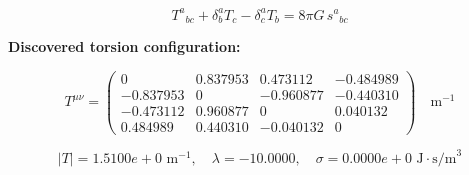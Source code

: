 
\begin{equation}
  T^a{}_{bc} + \delta^a_b T_c - \delta^a_c T_b = 8\pi G \, s^a{}_{bc}
\end{equation}

\textbf{Discovered torsion configuration:}

\begin{equation}
  T^{\mu\nu} = \begin{pmatrix}
    0 & 0.837953 & 0.473112 & -0.484989 \\
    -0.837953 & 0 & -0.960877 & -0.440310 \\
    -0.473112 & 0.960877 & 0 & 0.040132 \\
    0.484989 & 0.440310 & -0.040132 & 0
  \end{pmatrix} \quad \text{m}^{-1}
\end{equation}

\begin{equation}
  |T| = 1.5100e+0 \text{ m}^{-1}, \quad
  \lambda = -10.0000, \quad
  \sigma = 0.0000e+0 \text{ J}\cdot\text{s/m}^3
\end{equation}
